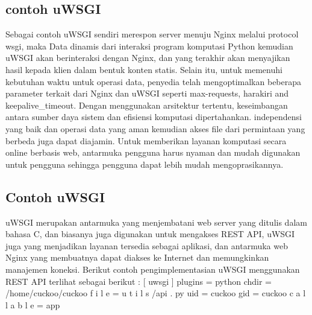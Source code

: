 \subsection{contoh uWSGI}
Sebagai contoh uWSGI sendiri merespon server 	menuju Nginx melalui protocol wsgi, maka Data dinamis dari interaksi program komputasi Python kemudian uWSGI akan berinteraksi dengan Nginx, dan yang terakhir akan menyajikan hasil kepada klien dalam bentuk konten statis. Selain itu, untuk memenuhi kebutuhan waktu untuk operasi data, penyedia  telah mengoptimalkan beberapa parameter terkait dari Nginx dan uWSGI seperti max-requests, harakiri and keepalive_timeout.
Dengan menggunakan arsitektur tertentu, keseimbangan antara sumber daya sistem dan efisiensi komputasi dipertahankan. independensi yang baik dan operasi data yang aman kemudian  akses file dari permintaan yang berbeda juga dapat diajamin. Untuk memberikan layanan komputasi secara online berbasis web, antarmuka pengguna harus nyaman dan mudah digunakan untuk pengguna sehingga pengguna dapat lebih mudah mengoprasikannya\cite{dong2015chemdes}.

\subsection {Contoh uWSGI}
uWSGI merupakan antarmuka yang menjembatani web server yang ditulis dalam bahasa C, dan biasanya juga digunakan untuk mengakses REST API, uWSGI juga yang menjadikan layanan tersedia sebagai aplikasi, dan antarmuka web Nginx yang membuatnya dapat diakses ke Internet dan memungkinkan manajemen koneksi. Berikut contoh pengimplementasian uWSGI menggunakan REST API terlihat sebagai berikut :
[ uwsgi ]
plugins = python
chdir = /home/cuckoo/cuckoo
f i l e = u t i l s /api . py
uid = cuckoo
gid = cuckoo
c a l l a b l e = app

